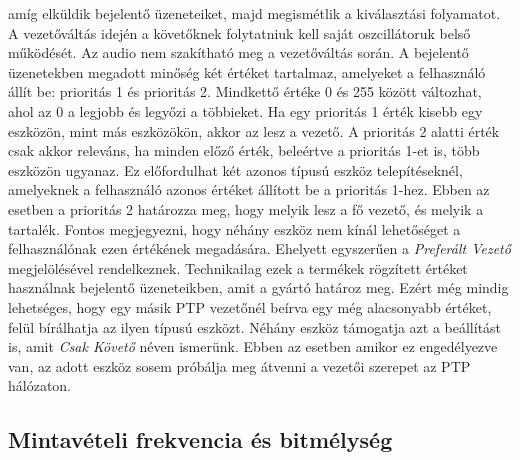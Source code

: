 amíg elküldik bejelentő üzeneteiket, majd megismétlik a kiválasztási folyamatot. 
A vezetőváltás idején a követőknek folytatniuk kell saját oszcillátoruk belső működését.
Az audio nem szakítható meg a vezetőváltás során.
A bejelentő üzenetekben megadott minőség két értéket tartalmaz, amelyeket a felhasználó állít be: prioritás 1 és prioritás 2.
Mindkettő értéke 0 és 255 között változhat, ahol az 0 a legjobb és legyőzi a többieket.
Ha egy prioritás 1 érték kisebb egy eszközön, mint más eszközökön,
akkor az lesz a vezető. A prioritás 2 alatti érték csak akkor releváns, ha
minden előző érték, beleértve a prioritás 1-et is, több eszközön ugyanaz. 
Ez előfordulhat két azonos típusú eszköz telepítéseknél, amelyeknek a felhasználó
azonos értéket állított be a prioritás 1-hez. Ebben az esetben a prioritás 2
határozza meg, hogy melyik lesz a fő vezető, és melyik a tartalék. 
Fontos megjegyezni, hogy néhány eszköz nem kínál lehetőséget a felhasználónak ezen értékének megadására.
Ehelyett egyszerűen a \textit{Preferált Vezető} megjelölésével rendelkeznek.
Technikailag ezek a termékek rögzített értéket használnak bejelentő üzeneteikben, amit a gyártó határoz meg.
Ezért még mindig lehetséges, hogy egy másik PTP vezetőnél beírva egy még alacsonyabb értéket, felül bírálhatja az ilyen típusú eszközt.
Néhány eszköz támogatja azt a beállítást is, amit \textit{Csak Követő} néven ismerünk. Ebben az esetben amikor ez engedélyezve van,
az adott eszköz sosem próbálja meg átvenni a vezetői szerepet az PTP hálózaton.
\subsection{Mintavételi frekvencia és bitmélység}
 





